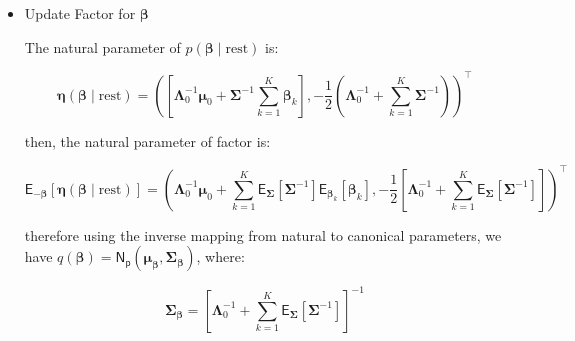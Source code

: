 \begin{appendix}
\begin{itemize}
therefore using the inverse mapping from natural to canonical parameters, we have $q(\bm{\beta}_k)=\mathsf{N_p}(\bm{\mu}_{\bm{\beta}_k},\bm{\Sigma}_{\bm{\beta}_k})$, where:

\begin{equation}
\bm{\Sigma}_{\bm{\beta}_k}^{-1} = \mathsf{E}_{\sigma^2_k}\left[{\sigma_k}^{-2}\right] \sum_{j=1}^{m}\mathsf{E}_{\gamma_j}\left[[\gamma_j=k\right]]\bm{X}_{j}^\top \bm{X}_{j}  + \mathsf{E}_{\bm{\Sigma}}\left[\bm{\Sigma}^{-1}\right] 
\end{equation}

and

\begin{equation}
\bm{\mu}_{\bm{\beta}_k}= \bm{\Sigma}_{\bm{\beta}_k}\left[\mathsf{E}_{\sigma^2_k}\left[{\sigma_k}^{-2}\right] \sum_{j=1}^{m}\mathsf{E}_{\gamma_j}\left[[\gamma_j=k\right]]\bm{X}_{j}^\top \bm{y}_{j} + \mathsf{E}_{\bm{\Sigma}}\left[\bm{\Sigma}^{-1}\right] \mathsf{E}_{\bm{\beta}}\left[\bm{\beta} \right] \right]
\end{equation}

\item Update Factor for $\bm{\beta}$

The natural parameter of $p(\bm{\beta}\mid \text{rest}) $ is:

\begin{equation}
\bm{\eta}(\bm{\beta}\mid \text{rest})=\left(\left[ \bm{\Lambda}_0^{-1} \bm{\mu}_0 + \bm{\Sigma}^{-1} \sum_{k=1}^{K}\bm{\beta}_k \right],-\frac{1}{2}\left( \bm{\Lambda}_0^{-1} + \sum_{k=1}^{K}\bm{\Sigma}^{-1} \right)\right)^\top
\end{equation}

then, the natural parameter of factor is:

\begin{equation}
\mathsf{E}_{-\bm{\beta}}\left[\bm{\eta}(\bm{\beta}\mid \text{rest})\right]=\left( \bm{\Lambda}_0^{-1} \bm{\mu}_0 +  \sum_{k=1}^{K}\mathsf{E}_{\bm{\Sigma}}\left[\bm{\Sigma}^{-1}\right]\mathsf{E}_{\bm{\beta}_k}\left[\bm{\beta}_k \right],-\frac{1}{2}\left[\bm{\Lambda}_0^{-1}   + \sum_{k=1}^{K}\mathsf{E}_{\bm{\Sigma}}\left[\bm{\Sigma}^{-1}\right]  \right]\right)^\top
\end{equation}

therefore using the inverse mapping from natural to canonical parameters, we have $q(\bm{\beta})=\mathsf{N_p}(\bm{\mu}_{\bm{\beta}},\bm{\Sigma}_{\bm{\beta}})$, where:

\begin{equation}
\bm{\Sigma}_{\bm{\beta}} = \left[\bm{\Lambda}_0^{-1}   + \sum_{k=1}^{K}\mathsf{E}_{\bm{\Sigma}}\left[\bm{\Sigma}^{-1}\right]  \right] ^{-1}
\end{equation}


\end{itemize}
\end{appendix}
